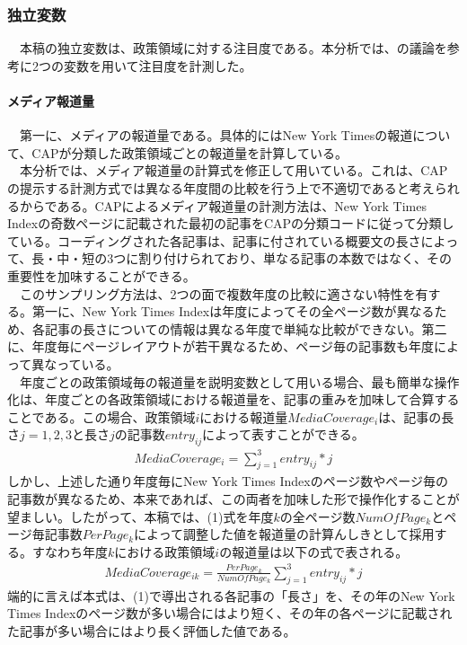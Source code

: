 \documentclass[here]{article}
\begin{document}
\subsubsection{独立変数}
　本稿の独立変数は、政策領域に対する注目度である。本分析では、\citet*{Adler2013-ay}の議論を参考に2つの変数を用いて注目度を計測した。\\
\paragraph*{メディア報道量}
　第一に、メディアの報道量である。具体的にはNew York Timesの報道について、CAPが分類した政策領域ごとの報道量を計算している。\\
　本分析では、メディア報道量の計算式を修正して用いている。これは、CAPの提示する計測方式では異なる年度間の比較を行う上で不適切であると考えられるからである。CAPによるメディア報道量の計測方法は、New York Times Indexの奇数ページに記載された最初の記事をCAPの分類コードに従って分類している。コーディングされた各記事は、記事に付されている概要文の長さによって、長・中・短の3つに割り付けられており、単なる記事の本数ではなく、その重要性を加味することができる。\\
　このサンプリング方法は、2つの面で複数年度の比較に適さない特性を有する。第一に、New York Times Indexは年度によってその全ページ数が異なるため、各記事の長さについての情報は異なる年度で単純な比較ができない。第二に、年度毎にページレイアウトが若干異なるため、ページ毎の記事数も年度によって異なっている。\\
　年度ごとの政策領域毎の報道量を説明変数として用いる場合、最も簡単な操作化は、年度ごとの各政策領域における報道量を、記事の重みを加味して合算することである。この場合、政策領域$i$における報道量$MediaCoverage_i$は、記事の長さ$j = 1,2,3$と長さ$j$の記事数$entry_{ij}$によって表すことができる。\\
\begin{align}
  MediaCoverage_i =  \sum_{j=1}^3 entry_{ij}*j
\end{align}
しかし、上述した通り年度毎にNew York Times Indexのページ数やページ毎の記事数が異なるため、本来であれば、この両者を加味した形で操作化することが望ましい。したがって、本稿では、(1)式を年度$k$の全ページ数$NumOfPage_k$とページ毎記事数$PerPage_k$によって調整した値を報道量の計算んしきとして採用する。すなわち年度$k$における政策領域$i$の報道量は以下の式で表される。\\
\begin{align}
  MediaCoverage_{ik} = \frac{PerPage_k}{NumOfPage_k} \sum_{j=1}^3 entry_{ij}*j
\end{align}
端的に言えば本式は、(1)で導出される各記事の「長さ」を、その年のNew York Times Indexのページ数が多い場合にはより短く、その年の各ページに記載された記事が多い場合にはより長く評価した値である。
\end{document}
